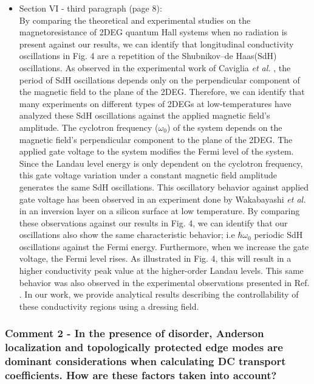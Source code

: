 \documentclass{article}
\begin{document}
\begin{itemize}
  \item Section VI - third paragraph (page 8):\\
  {\color{Red}
  By comparing the theoretical \cite{ando72,ando74_1,ando74_2,ando74_3,ando74_4,ando82,endo09} and experimental \cite{endo09,wakabayashi78,ochiai190,mancoff96,arapov02,grbic04,caviglia10} studies on the magnetoresistance of 2DEG quantum Hall systems when no radiation is present against our results, we can identify that longitudinal conductivity oscillations in Fig. 4 are a repetition of the Shubnikov–de Haas(SdH) oscillations.
  As observed in the experimental work of Caviglia \textit{et al.} \cite{caviglia10}, the period of SdH oscillations depends only on the perpendicular component of the magnetic field to the plane of the 2DEG.
  Therefore, we can identify that many experiments on different types of 2DEGs at low-temperatures \cite{endo09,ochiai190,mancoff96,arapov02,grbic04,caviglia10} have analyzed these SdH oscillations against the applied magnetic field's amplitude.
  The cyclotron frequency ($\omega_0$) of the system depends on the magnetic field's perpendicular component to the plane of the 2DEG.
  The applied gate voltage to the system modifies the Fermi level of the system.
  Since the Landau level energy is only dependent on the cyclotron frequency, this gate voltage variation under a constant magnetic field amplitude generates the same SdH oscillations.
  This oscillatory behavior against applied gate voltage has been observed in an  experiment done by Wakabayashi \textit{et al.} \cite{wakabayashi78} in an inversion layer on a silicon surface at low temperature.
  By comparing these observations against our results in Fig. 4, we can identify that our oscillations also show the same characteristic behavior; i.e  $\hbar\omega_0$ periodic SdH oscillations against the Fermi energy.
  Furthermore, when we increase the gate voltage, the Fermi level rises. As illustrated in Fig. 4, this will result in a higher conductivity peak value at the higher-order Landau levels. This same behavior was also observed in the experimental observations presented in Ref. \cite{wakabayashi78}.
  In our work, we provide analytical results describing the controllability of these conductivity regions using a dressing field.
  }
\end{itemize}

\subsubsection*{Comment 2 -
\color{RoyalBlue} In the presence of disorder, Anderson localization and topologically protected edge modes are dominant considerations when calculating DC transport coefficients. How are these factors taken into account?
}
\end{document}
